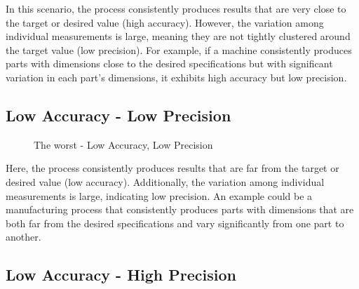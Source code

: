 \documentclass[
  a4paper,
]{scrbook}
\begin{document}
In this scenario, the process consistently produces results that are
very close to the target or desired value (high accuracy). However, the
variation among individual measurements is large, meaning they are not
tightly clustered around the target value (low precision). For example,
if a machine consistently produces parts with dimensions close to the
desired specifications but with significant variation in each part's
dimensions, it exhibits high accuracy but low precision.

\subsection{Low Accuracy - Low
Precision}\label{low-accuracy---low-precision}

\begin{figure}[H]


\caption{\label{fig-lalp}The worst - Low Accuracy, Low Precision}

\end{figure}%

Here, the process consistently produces results that are far from the
target or desired value (low accuracy). Additionally, the variation
among individual measurements is large, indicating low precision. An
example could be a manufacturing process that consistently produces
parts with dimensions that are both far from the desired specifications
and vary significantly from one part to another.

\subsection{Low Accuracy - High
Precision}\label{low-accuracy---high-precision}
\end{document}
